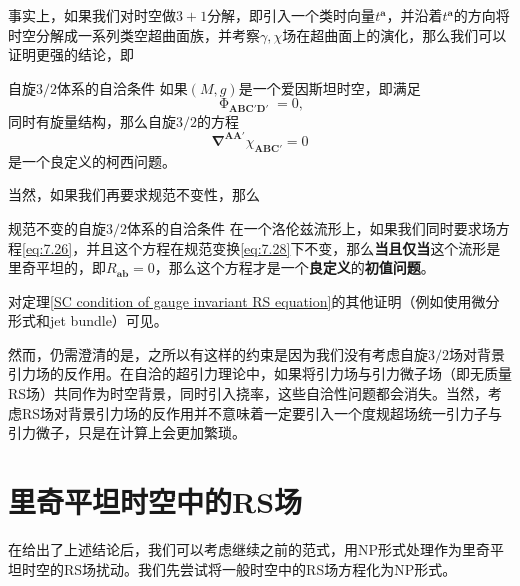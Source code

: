 事实上，如果我们对时空做$3+1$分解，即引入一个类时向量$t^{\boldsymbol{a}}$，并沿着$t^{\boldsymbol{a}}$的方向将时空分解成一系列类空超曲面族，并考察$\gamma ,\chi $场在超曲面上的演化，那么我们可以证明更强的结论，即\parencite{frauendiener_spin32_1995}
\begin{them}[label={SC condition of RS equation}]{自旋$3/2$体系的自洽条件}
	如果$( M,g)$是一个爱因斯坦时空，即满足
	\begin{equation*}
		\upPhi _{\boldsymbol{ABC} '\boldsymbol{D} '} =0,
	\end{equation*}
	同时有旋量结构，那么自旋$3/2$的方程
	\begin{equation*}
		\mathbf{\nabla }^{\boldsymbol{AA} '} \chi _{\boldsymbol{ABC} '} =0
	\end{equation*}
	是一个良定义的柯西问题。
\end{them}

当然，如果我们再要求规范不变性，那么
\begin{them}[label={SC condition of gauge invariant RS equation}]{规范不变的自旋$3/2$体系的自洽条件}
	在一个洛伦兹流形上，如果我们同时要求场方程\ref{eq:7.26}，并且这个方程在规范变换\ref{eq:7.28}下不变，那么\textbf{当且仅当}这个流形是里奇平坦的，即$R_{\boldsymbol{ab}} =0$，那么这个方程才是一个\textbf{良定义}的\textbf{初值问题}。
\end{them}

对定理\ref{SC condition of gauge invariant RS equation}的其他证明（例如使用微分形式和jet bundle）可见\parencite{robinson_differential_1995}。

然而，仍需澄清的是，之所以有这样的约束是因为我们没有考虑自旋$3/2$场对背景引力场的反作用\parencite{buchdahl_compatibility_1958,christensen_new_1979}。在自洽的超引力理论中，如果将引力场与引力微子场（即无质量RS场）共同作为时空背景，同时引入挠率，这些自洽性问题都会消失。当然，考虑RS场对背景引力场的反作用并不意味着一定要引入一个度规超场统一引力子与引力微子，只是在计算上会更加繁琐。


\section{里奇平坦时空中的RS场}

在给出了上述结论后，我们可以考虑继续之前的范式，用NP形式处理作为里奇平坦时空的RS场扰动。我们先尝试将一般时空中的RS场方程化为NP形式。



